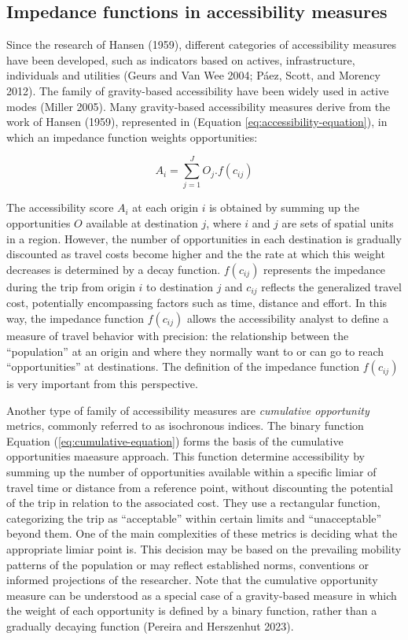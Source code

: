 \documentclass[preprint, 3p,
authoryear]{elsarticle} %
\begin{document}
\subsection{Impedance functions in accessibility
measures}\label{impedance-functions-in-accessibility-measures}

Since the research of Hansen (1959), different categories of
accessibility measures have been developed, such as indicators based on
actives, infrastructure, individuals and utilities (Geurs and Van Wee
2004; Páez, Scott, and Morency 2012). The family of gravity-based
accessibility have been widely used in active modes (Miller 2005). Many
gravity-based accessibility measures derive from the work of Hansen
(1959), represented in (Equation \ref{eq:accessibility-equation}), in
which an impedance function weights opportunities:

\begin{equation}
A_{i} = \sum_{j=1}^J O_j .f(c_{ij})
\label{eq:accessibility-equation}
\end{equation}

The accessibility score \(A_{i}\) at each origin \(i\) is obtained by
summing up the opportunities \(O\) available at destination \(j\), where
\(i\) and \(j\) are sets of spatial units in a region. However, the
number of opportunities in each destination is gradually discounted as
travel costs become higher and the the rate at which this weight
decreases is determined by a decay function. \(f(c_{ij})\) represents
the impedance during the trip from origin \(i\) to destination \(j\) and
\(c_{ij}\) reflects the generalized travel cost, potentially
encompassing factors such as time, distance and effort. In this way, the
impedance function \(f(c_{ij})\) allows the accessibility analyst to
define a measure of travel behavior with precision: the relationship
between the ``population'' at an origin and where they normally want to
or can go to reach ``opportunities'' at destinations. The definition of
the impedance function \(f(c_{ij})\) is very important from this
perspective.

Another type of family of accessibility measures are \emph{cumulative
opportunity} metrics, commonly referred to as isochronous indices. The
binary function Equation (\ref{eq:cumulative-equation}) forms the basis
of the cumulative opportunities maeasure approach. This function
determine accessibility by summing up the number of opportunities
available within a specific limiar of travel time or distance from a
reference point, without discounting the potential of the trip in
relation to the associated cost. They use a rectangular function,
categorizing the trip as ``acceptable'' within certain limits and
``unacceptable'' beyond them. One of the main complexities of these
metrics is deciding what the appropriate limiar point is. This decision
may be based on the prevailing mobility patterns of the population or
may reflect established norms, conventions or informed projections of
the researcher. Note that the cumulative opportunity measure can be
understood as a special case of a gravity-based measure in which the
weight of each opportunity is defined by a binary function, rather than
a gradually decaying function (Pereira and Herszenhut 2023).
\end{document}
